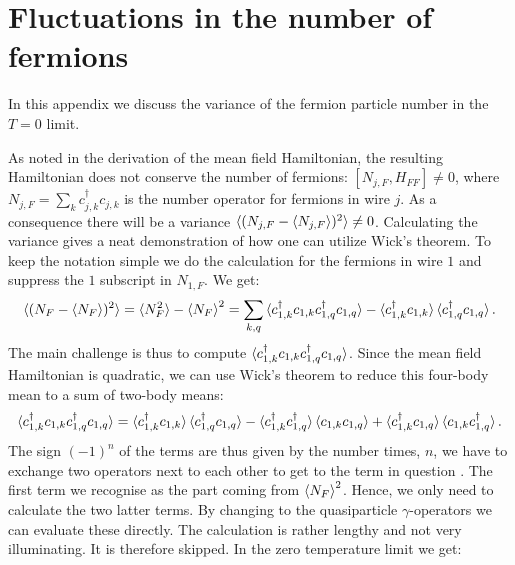 
\chapter{Fluctuations in the number of fermions} %

\label{Appendix.fermionnumberfluctuation} 
In this appendix we discuss the variance of the fermion particle number in the $T = 0$ limit. 

As noted in the derivation of the mean field Hamiltonian, the resulting Hamiltonian does not conserve the number of fermions: $[N_{j,F}, H_{FF}] \neq 0 $, where $N_{j,F} = \sum_k c^\dagger_{j,k} c_{j,k}$ is the number operator for fermions in wire $j$. As a consequence there will be a variance $\braket{(N_{j,F}-\braket{N_{j,F}})^2} \neq 0$. Calculating the variance gives a neat demonstration of how one can utilize Wick's theorem. To keep the notation simple we do the calculation for the fermions in wire $1$ and suppress the $1$ subscript in $N_{1,F}$. We get:
\begin{equation}
\braket{(N_F - {\braket{N_F}})^2} = \braket{N_F^2} - \braket{N_F}^2 = \sum_{k,q} \braket{c^\dagger_{1,k}c_{1,k}c^\dagger_{1,q}c_{1,q}} - \braket{c^\dagger_{1,k}c_{1,k}}\braket{c^\dagger_{1,q}c_{1,q}}. \nonumber
\end{equation} 
The main challenge is thus to compute $\braket{c^\dagger_{1,k}c_{1,k}c^\dagger_{1,q}c_{1,q}}$. Since the mean field Hamiltonian is quadratic, we can use Wick's theorem to reduce this four-body mean to a sum of two-body means:
\begin{equation}
\braket{c^\dagger_{1,k}c_{1,k}c^\dagger_{1,q}c_{1,q}} = \braket{c^\dagger_{1,k}c_{1,k}}\braket{c^\dagger_{1,q}c_{1,q}} - \braket{c^\dagger_{1,k}c^\dagger_{1,q}}\braket{c_{1,k}c_{1,q}} + \braket{c^\dagger_{1,k}c_{1,q}}\braket{c_{1,k}c^\dagger_{1,q}}. \nonumber
\end{equation}
The sign $(-1)^{n}$ of the terms are thus given by the number times, $n$, we have to exchange two operators next to each other to get to the term in question \cite[pp. 198-202]{BruusFlensberg}. The first term we recognise as the part coming from $\braket{N_F}^2$. Hence, we only need to calculate the two latter terms. By changing to the quasiparticle $\gamma$-operators we can evaluate these directly. The calculation is rather lengthy and not very illuminating. It is therefore skipped. In the zero temperature limit we get:
